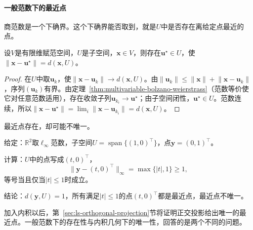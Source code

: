 \paragraph{一般范数下的最近点}
商范数是一个下确界。这个下确界能否取到，就是$U$中是否存在离给定点最近的点。
\begin{theorem}[最近点的存在]
\label{thm:multivariable-nearest-point-existence}
设$V$是有限维赋范空间，$U$是子空间，$\bm x\in V$，则存在$\bm u^\star\in U$，使$\lVert\bm x-\bm u^\star\rVert=d(\bm x,U)$。
\end{theorem}
\begin{proof}
在$U$中取$\bm u_k$，使$\lVert\bm x-\bm u_k\rVert\to d(\bm x,U)$。由$\lVert\bm u_k\rVert\leq\lVert\bm x\rVert+\lVert\bm x-\bm u_k\rVert$，序列$(\bm u_k)$有界。由定理~\ref{thm:multivariable-bolzano-weierstrass}（范数等价使它对任意范数适用），存在收敛子列$\bm u_{k_i}\to\bm u^\star$；由子空间闭性，$\bm u^\star\in U$。范数连续，所以$\lVert\bm x-\bm u^\star\rVert=\lim_i\lVert\bm x-\bm u_{k_i}\rVert=d(\bm x,U)$。
\end{proof}
最近点存在，却可能不唯一。
\begin{example}
\label{ex:ls-linf-nonunique-nearest}
给定：$\mathbb R^2$取$\ell_\infty$范数，子空间$U=\operatorname{span}\{(1,0)^\top\}$，点$\bm y=(0,1)^\top$。

计算：$U$中的点写成$(t,0)^\top$，
\[
 \lVert\bm y-(t,0)^\top\rVert_\infty=\max\{|t|,1\}\geq1,
\]
等号当且仅当$|t|\leq1$时成立。

结论：$d(\bm y,U)=1$，所有满足$|t|\leq1$的点$(t,0)^\top$都是最近点，最近点不唯一。
\end{example}
加入内积以后，第~\ref{sec:ls-orthogonal-projection}节将证明正交投影给出唯一的最近点。一般范数下的存在性与内积几何下的唯一性，回答的是两个不同的问题。

